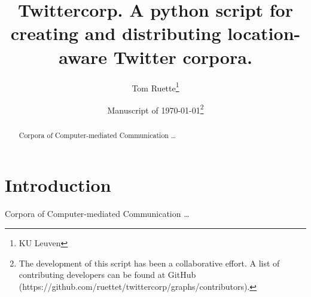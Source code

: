 \documentclass[a4paper,10pt]{article}
\title{Twittercorp. A python script for creating and distributing location-aware Twitter corpora.}
\author{Tom Ruette\thanks{KU Leuven}}
\date{Manuscript of \today\thanks{The development of this script has been a collaborative effort. A list of contributing developers can be found at GitHub (https://github.com/ruettet/twittercorp/graphs/contributors).}}
\begin{document}
\maketitle

\begin{abstract}
Corpora of Computer-mediated Communication \ldots
\end{abstract}

\section{Introduction}

Corpora of Computer-mediated Communication \ldots
\end{document}
